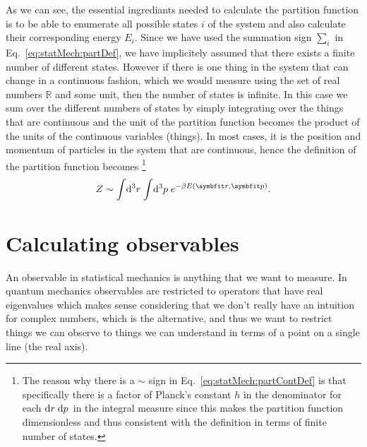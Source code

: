 As we can see, the essential ingrediants needed to calculate the partition function is to be able to
enumerate all possible states $i$ of the system and also calculate their corresponding energy $E_i$.
Since we have used the summation sign $\sum_i$ in Eq.~\eqref{eq:statMech:partDef}, we have implicitely
assumed that there exists a finite number of different states. However if there is one thing in the
system that can change in a continuous fashion, which we would measure using the set of real numbers
$\mathbb{R}$ and some unit, then the number of states is infinite. In this case we sum over the
different numbers of states by simply integrating over the things that are continuous and the unit
of the partition function becomes the product of the units of the continuous variables (things).
In most cases, it is the position and momentum of particles in the system that are continuous, hence
the definition of the partition function becomes%
\footnote{The reason why there is a $\sim$ sign in Eq.~\eqref{eq:statMech:partContDef} is that specifically there is a factor
of Planck's constant $h$ in the denominator for each $\mathop{\textrm{d}\kern0emr\kern0.1em}\mathop{\textrm{d}\kern0emp\kern0.1em}$ in the integral measure since this makes the partition function
dimensionless and thus consistent with the definition in terms of finite number of states.}
\begin{equation}
    Z \sim \sint\d{^3r}\sint\d{^3p} e^{-\beta E(\v{r},\v{p})}.
    \label{eq:statMech:partContDef}
\end{equation}

\section{Calculating observables}

An observable in statistical mechanics is anything that we want to measure. In quantum mechanics observables
are restricted to operators that have real eigenvalues which makes sense considering that we don't really
have an intuition for complex numbers, which is the alternative, and thus we want to restrict things we
can observe to things we can understand in terms of a point on a single line (the real axis). 

